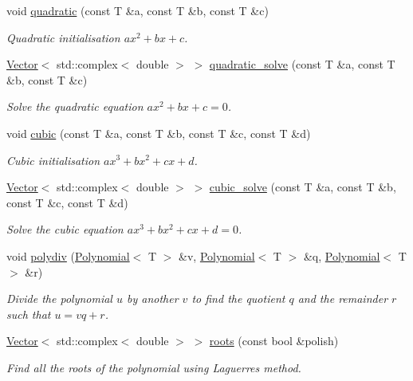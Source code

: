 \begin{DoxyCompactItemize}
void \hyperlink{classLuna_1_1Polynomial_acfcaf54342579a975c876d353242b1b5}{quadratic} (const T \&a, const T \&b, const T \&c)
\begin{DoxyCompactList}\small\item\em Quadratic initialisation $ ax^2 + bx + c $. \end{DoxyCompactList}\item 
\hyperlink{classLuna_1_1Vector}{Vector}$<$ std\+::complex$<$ double $>$ $>$ \hyperlink{classLuna_1_1Polynomial_a801a06a8f76a415ce1368daea1c77abb}{quadratic\+\_\+solve} (const T \&a, const T \&b, const T \&c)
\begin{DoxyCompactList}\small\item\em Solve the quadratic equation $ ax^2 + bx + c = 0 $. \end{DoxyCompactList}\item 
void \hyperlink{classLuna_1_1Polynomial_af1becea2a2199ca5401a326549561486}{cubic} (const T \&a, const T \&b, const T \&c, const T \&d)
\begin{DoxyCompactList}\small\item\em Cubic initialisation $ ax^3 + bx^2 + cx + d $. \end{DoxyCompactList}\item 
\hyperlink{classLuna_1_1Vector}{Vector}$<$ std\+::complex$<$ double $>$ $>$ \hyperlink{classLuna_1_1Polynomial_aaef399eff187c6a97b1931186c60035f}{cubic\+\_\+solve} (const T \&a, const T \&b, const T \&c, const T \&d)
\begin{DoxyCompactList}\small\item\em Solve the cubic equation $ ax^3 + bx^2 + cx + d = 0 $. \end{DoxyCompactList}\item 
void \hyperlink{classLuna_1_1Polynomial_a920305bb60451d65e1f4b9f80fa9f436}{polydiv} (\hyperlink{classLuna_1_1Polynomial}{Polynomial}$<$ T $>$ \&v, \hyperlink{classLuna_1_1Polynomial}{Polynomial}$<$ T $>$ \&q, \hyperlink{classLuna_1_1Polynomial}{Polynomial}$<$ T $>$ \&r)
\begin{DoxyCompactList}\small\item\em Divide the polynomial $u$ by another $v$ to find the quotient $q$ and the remainder $r$ such that $ u = vq + r $. \end{DoxyCompactList}\item 
\hyperlink{classLuna_1_1Vector}{Vector}$<$ std\+::complex$<$ double $>$ $>$ \hyperlink{classLuna_1_1Polynomial_ab045b5ac29660de6d5a54246ed1bec70}{roots} (const bool \&polish)
\begin{DoxyCompactList}\small\item\em Find all the roots of the polynomial using Laguerre\textquotesingle{}s method. \end{DoxyCompactList}\item 

\end{DoxyCompactItemize}
